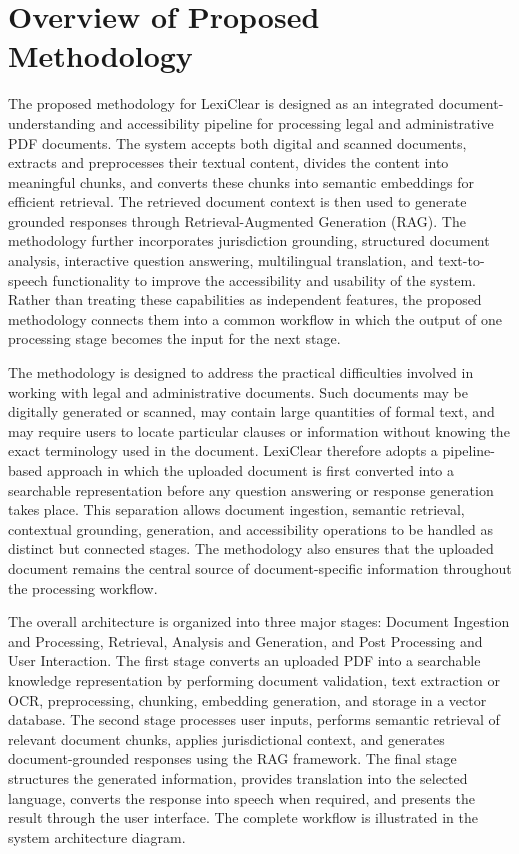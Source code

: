 \documentclass[12pt,a4paper,oneside]{report}
\begin{document}
\section{Overview of Proposed Methodology}

The proposed methodology for LexiClear is designed as an integrated
document-understanding and accessibility pipeline for processing legal and
administrative PDF documents. The system accepts both digital and scanned
documents, extracts and preprocesses their textual content, divides the
content into meaningful chunks, and converts these chunks into semantic
embeddings for efficient retrieval. The retrieved document context is then
used to generate grounded responses through Retrieval-Augmented Generation
(RAG). The methodology further incorporates jurisdiction grounding,
structured document analysis, interactive question answering, multilingual
translation, and text-to-speech functionality to improve the accessibility
and usability of the system. Rather than treating these capabilities as
independent features, the proposed methodology connects them into a common
workflow in which the output of one processing stage becomes the input for
the next stage.

The methodology is designed to address the practical difficulties involved
in working with legal and administrative documents. Such documents may be
digitally generated or scanned, may contain large quantities of formal text,
and may require users to locate particular clauses or information without
knowing the exact terminology used in the document. LexiClear therefore
adopts a pipeline-based approach in which the uploaded document is first
converted into a searchable representation before any question answering or
response generation takes place. This separation allows document ingestion,
semantic retrieval, contextual grounding, generation, and accessibility
operations to be handled as distinct but connected stages. The methodology
also ensures that the uploaded document remains the central source of
document-specific information throughout the processing workflow.

The overall architecture is organized into three major stages: Document
Ingestion and Processing, Retrieval, Analysis and Generation, and Post
Processing and User Interaction. The first stage converts an uploaded PDF
into a searchable knowledge representation by performing document
validation, text extraction or OCR, preprocessing, chunking, embedding
generation, and storage in a vector database. The second stage processes
user inputs, performs semantic retrieval of relevant document chunks,
applies jurisdictional context, and generates document-grounded responses
using the RAG framework. The final stage structures the generated
information, provides translation into the selected language, converts the
response into speech when required, and presents the result through the user
interface. The complete workflow is illustrated in the system architecture
diagram.
\end{document}
